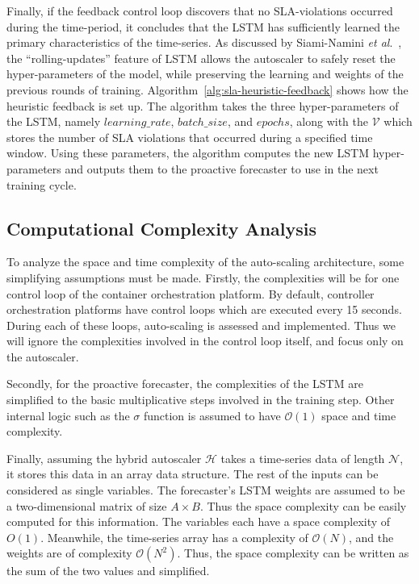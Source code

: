 Finally, if the feedback control loop discovers that no SLA-violations occurred during the time-period, it concludes that the LSTM has sufficiently learned the primary characteristics of the time-series. As discussed by Siami-Namini \textit{et al}.~\cite{siami2018comparison}, the ``rolling-updates'' feature of LSTM allows the autoscaler to safely reset the hyper-parameters of the model, while preserving the learning and weights of the previous rounds of training. Algorithm~\ref{alg:sla-heuristic-feedback} shows how the heuristic feedback is set up. The algorithm takes the three hyper-parameters of the LSTM, namely $learning\_rate$, $batch\_size$, and $epochs$, along with the $\mathcal{V}$ which stores the number of SLA violations that occurred during a specified time window. Using these parameters, the algorithm computes the new LSTM hyper-parameters and outputs them to the proactive forecaster to use in the next training cycle.\par

\subsection{Computational Complexity Analysis}
\label{subsec:ch4-space-time-comp}

To analyze the space and time complexity of the auto-scaling architecture, some simplifying assumptions must be made. Firstly, the complexities will be for one control loop of the container orchestration platform. By default, controller orchestration platforms have control loops which are executed every 15 seconds. During each of these loops, auto-scaling is assessed and implemented. Thus we will ignore the complexities involved in the control loop itself, and focus only on the autoscaler.\par

Secondly, for the proactive forecaster, the complexities of the LSTM are simplified to the basic multiplicative steps involved in the training step. Other internal logic such as the $\sigma$ function is assumed to have $\mathcal{O}(1)$ space and time complexity.\par

Finally, assuming the hybrid autoscaler $\mathcal{H}$ takes a time-series data of length $\mathcal{N}$, it stores this data in an array data structure. The rest of the inputs can be considered as single variables. The forecaster's LSTM weights are assumed to be a two-dimensional matrix of size $A \times B$. Thus the space complexity can be easily computed for this information. The variables each have a space complexity of $O(1)$. Meanwhile, the time-series array has a complexity of $\mathcal{O}(N)$, and the weights are of complexity $\mathcal{O}(N^2)$. Thus, the space complexity can be written as the sum of the two values and simplified.

